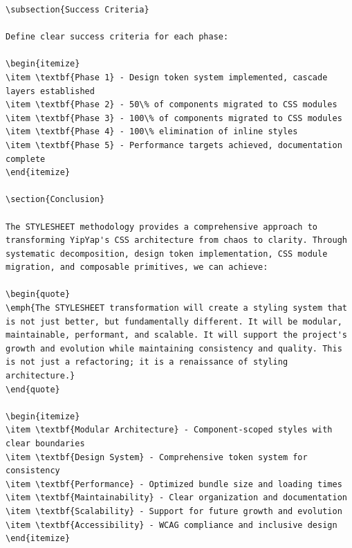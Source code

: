 \documentclass[11pt]{article}
\begin{document}
\begin{lstlisting}[style=markdown]
\subsection{Success Criteria}

Define clear success criteria for each phase:

\begin{itemize}
\item \textbf{Phase 1} - Design token system implemented, cascade layers established
\item \textbf{Phase 2} - 50\% of components migrated to CSS modules
\item \textbf{Phase 3} - 100\% of components migrated to CSS modules
\item \textbf{Phase 4} - 100\% elimination of inline styles
\item \textbf{Phase 5} - Performance targets achieved, documentation complete
\end{itemize}

\section{Conclusion}

The STYLESHEET methodology provides a comprehensive approach to transforming YipYap's CSS architecture from chaos to clarity. Through systematic decomposition, design token implementation, CSS module migration, and composable primitives, we can achieve:

\begin{quote}
\emph{The STYLESHEET transformation will create a styling system that is not just better, but fundamentally different. It will be modular, maintainable, performant, and scalable. It will support the project's growth and evolution while maintaining consistency and quality. This is not just a refactoring; it is a renaissance of styling architecture.}
\end{quote}

\begin{itemize}
\item \textbf{Modular Architecture} - Component-scoped styles with clear boundaries
\item \textbf{Design System} - Comprehensive token system for consistency
\item \textbf{Performance} - Optimized bundle size and loading times
\item \textbf{Maintainability} - Clear organization and documentation
\item \textbf{Scalability} - Support for future growth and evolution
\item \textbf{Accessibility} - WCAG compliance and inclusive design
\end{itemize}


\end{lstlisting}
\end{document}
